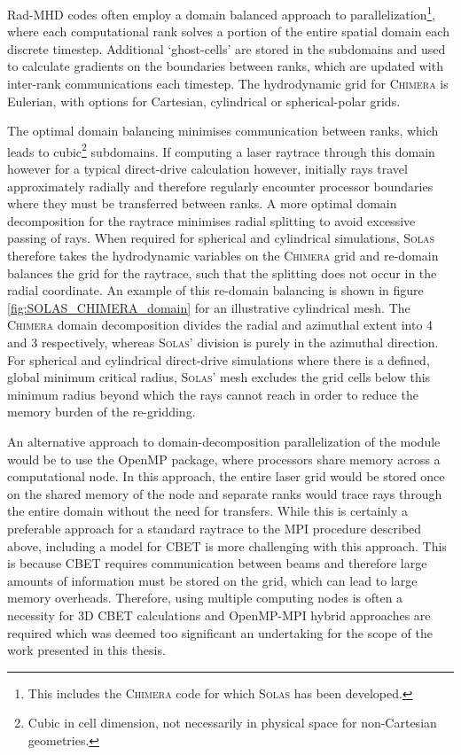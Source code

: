 \ac{Rad-MHD} codes often employ a domain balanced approach to parallelization\footnote{This includes the \textsc{Chimera} code for which \textsc{Solas} has been developed.}, where each computational rank solves a portion of the entire spatial domain each discrete timestep.
Additional `ghost-cells' are stored in the subdomains and used to calculate gradients on the boundaries between ranks, which are updated with inter-rank communications each timestep.
The hydrodynamic grid for \textsc{Chimera} is Eulerian, with options for Cartesian, cylindrical or spherical-polar grids.

The optimal domain balancing minimises communication between ranks, which leads to cubic\footnote{Cubic in cell dimension, not necessarily in physical space for non-Cartesian geometries.} subdomains.
If computing a laser raytrace through this domain however for a typical direct-drive calculation however, initially rays travel approximately radially and therefore regularly encounter processor boundaries where they must be transferred between ranks.
A more optimal domain decomposition for the raytrace minimises radial splitting to avoid excessive passing of rays.
When required for spherical and cylindrical simulations, \textsc{Solas} therefore takes the hydrodynamic variables on the \textsc{Chimera} grid and re-domain balances the grid for the raytrace, such that the splitting does not occur in the radial coordinate.
An example of this re-domain balancing is shown in figure \ref{fig:SOLAS_CHIMERA_domain} for an illustrative cylindrical mesh.
The \textsc{Chimera} domain decomposition divides the radial and azimuthal extent into 4 and 3 respectively, whereas \textsc{Solas}' division is purely in the azimuthal direction.
For spherical and cylindrical direct-drive simulations where there is a defined, global minimum critical radius, \textsc{Solas}' mesh excludes the grid cells below this minimum radius beyond which the rays cannot reach in order to reduce the memory burden of the re-gridding.

An alternative approach to domain-decomposition parallelization of the module would be to use the \ac{OpenMP} package, where processors share memory across a computational node.
In this approach, the entire laser grid would be stored once on the shared memory of the node and separate ranks would trace rays through the entire domain without the need for transfers.
While this is certainly a preferable approach for a standard raytrace to the \ac{MPI} procedure described above, including a model for \ac{CBET} is more challenging with this approach.
This is because \ac{CBET} requires communication between beams and therefore large amounts of information must be stored on the grid, which can lead to large memory overheads.
Therefore, using multiple computing nodes is often a necessity for 3D \ac{CBET} calculations and \ac{OpenMP}-\ac{MPI} hybrid approaches are required which was deemed too significant an undertaking for the scope of the work presented in this thesis.



